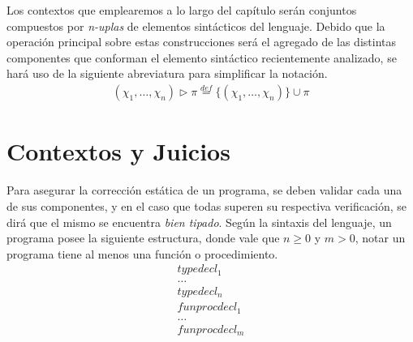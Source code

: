 Los contextos que emplearemos a lo largo del capítulo serán conjuntos compuestos por \textit{n-uplas} de elementos sintácticos del lenguaje.
Debido que la operación principal sobre estas construcciones será el agregado de las distintas componentes que conforman el elemento sintáctico recientemente analizado, se hará uso de la siguiente abreviatura para simplificar la notación.
\begin{gather*}
(\chi_1, \ldots, \chi_n) \triangleright \pi \overset{def}{=} \{ (\chi_1, \ldots, \chi_n) \} \cup \pi
\end{gather*}

\section{Contextos y Juicios}

Para asegurar la corrección estática de un programa, se deben validar cada una de sus componentes, y en el caso que todas superen su respectiva verificación, se dirá que el mismo se encuentra \textit{bien tipado}.
Según la sintaxis del lenguaje, un programa posee la siguiente estructura, donde vale que $n \geq 0$ y $m > 0$, notar un programa tiene al menos una función o procedimiento.
\begin{gather*}
typedecl_1 \\
\ldots \\
typedecl_n \\
funprocdecl_1 \\
\ldots \\
funprocdecl_m
\end{gather*}